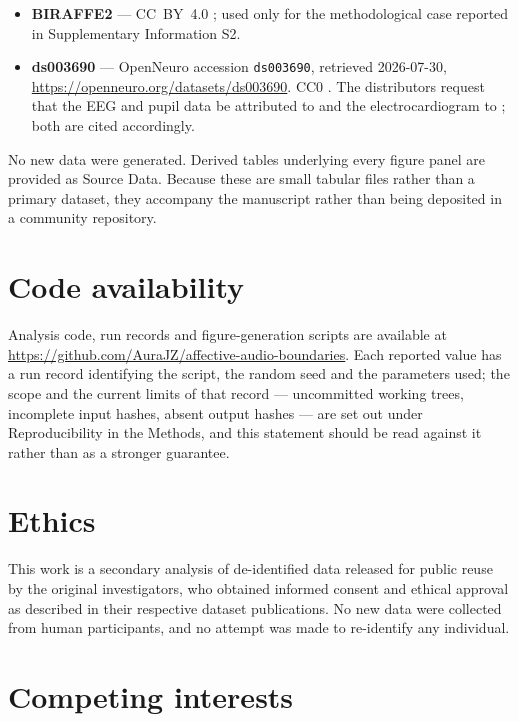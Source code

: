 \begin{itemize}
cross-individual analysis only; the non-commercial term means the material
itself cannot be reused in an application, whereas the calibration requirement
estimated from it can.
\item \textbf{BIRAFFE2} --- CC~BY~4.0 \citep{kutt2022}; used only for the
methodological case reported in Supplementary Information S2.
\item \textbf{ds003690} --- OpenNeuro accession \texttt{ds003690}, retrieved
2026-07-30, \url{https://openneuro.org/datasets/ds003690}. CC0
\citep{ds003690}. The distributors request that the EEG and pupil data be
attributed to \citet{ribeiro2019erp} and the electrocardiogram to
\citet{ribeiro2019cardiac}; both are cited accordingly.
\end{itemize}

No new data were generated. Derived tables underlying every figure panel are
provided as Source Data. Because these are small tabular files rather than a
primary dataset, they accompany the manuscript rather than being deposited in a
community repository.

\section*{Code availability}

Analysis code, run records and figure-generation scripts are available at
\url{https://github.com/AuraJZ/affective-audio-boundaries}. Each reported value
has a run record identifying the script, the random seed and the parameters used;
the scope and the current limits of that record --- uncommitted working trees,
incomplete input hashes, absent output hashes --- are set out under
Reproducibility in the Methods, and this statement should be read against it
rather than as a stronger guarantee.

\section*{Ethics}

This work is a secondary analysis of de-identified data released for public reuse
by the original investigators, who obtained informed consent and ethical approval
as described in their respective dataset publications. No new data were collected
from human participants, and no attempt was made to re-identify any individual.

\section*{Competing interests}

